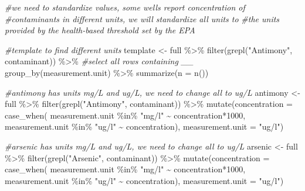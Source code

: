 \documentclass[12pt, twoside]{amherstthesis}
\newenvironment{Shaded}{\begin{snugshade}}{\end{snugshade}}
\newcommand{\AttributeTok}[1]{\textcolor[rgb]{0.77,0.63,0.00}{#1}}
\newcommand{\CommentTok}[1]{\textcolor[rgb]{0.56,0.35,0.01}{\textit{#1}}}
\newcommand{\DecValTok}[1]{\textcolor[rgb]{0.00,0.00,0.81}{#1}}
\newcommand{\FunctionTok}[1]{\textcolor[rgb]{0.00,0.00,0.00}{#1}}
\newcommand{\NormalTok}[1]{#1}
\newcommand{\OtherTok}[1]{\textcolor[rgb]{0.56,0.35,0.01}{#1}}
\newcommand{\SpecialCharTok}[1]{\textcolor[rgb]{0.00,0.00,0.00}{#1}}
\newcommand{\StringTok}[1]{\textcolor[rgb]{0.31,0.60,0.02}{#1}}
\begin{document}
\begin{Shaded}
\begin{Highlighting}[]
\CommentTok{\#we need to standardize values, some wells report concentration of}
\CommentTok{\#contaminants in different units, we will standardize all units to }
\CommentTok{\#the units provided by the health{-}based threshold set by the EPA}

\CommentTok{\#template to find different units}
\NormalTok{template }\OtherTok{\textless{}{-}}\NormalTok{ full }\SpecialCharTok{\%\textgreater{}\%}
  \FunctionTok{filter}\NormalTok{(}\FunctionTok{grepl}\NormalTok{(}\StringTok{"Antimony"}\NormalTok{, contaminant)) }\SpecialCharTok{\%\textgreater{}\%} \CommentTok{\#select all rows containing \_\_}
  \FunctionTok{group\_by}\NormalTok{(measurement.unit) }\SpecialCharTok{\%\textgreater{}\%}
  \FunctionTok{summarize}\NormalTok{(}\AttributeTok{n =} \FunctionTok{n}\NormalTok{())}

\CommentTok{\#antimony has units mg/L and ug/L, we need to change all to ug/L}
\NormalTok{antimony }\OtherTok{\textless{}{-}}\NormalTok{ full }\SpecialCharTok{\%\textgreater{}\%}
  \FunctionTok{filter}\NormalTok{(}\FunctionTok{grepl}\NormalTok{(}\StringTok{"Antimony"}\NormalTok{, contaminant)) }\SpecialCharTok{\%\textgreater{}\%}
  \FunctionTok{mutate}\NormalTok{(}\AttributeTok{concentration =} 
           \FunctionTok{case\_when}\NormalTok{(}
\NormalTok{             measurement.unit }\SpecialCharTok{\%in\%} \StringTok{"mg/l"} \SpecialCharTok{\textasciitilde{}}\NormalTok{ concentration}\SpecialCharTok{*}\DecValTok{1000}\NormalTok{,}
\NormalTok{             measurement.unit }\SpecialCharTok{\%in\%} \StringTok{"ug/l"} \SpecialCharTok{\textasciitilde{}}\NormalTok{ concentration),}
         \AttributeTok{measurement.unit =} \StringTok{"ug/l"}\NormalTok{)}
  
\CommentTok{\#arsenic has units mg/L and ug/L, we need to change all to ug/L}
\NormalTok{arsenic }\OtherTok{\textless{}{-}}\NormalTok{ full }\SpecialCharTok{\%\textgreater{}\%}
  \FunctionTok{filter}\NormalTok{(}\FunctionTok{grepl}\NormalTok{(}\StringTok{"Arsenic"}\NormalTok{, contaminant)) }\SpecialCharTok{\%\textgreater{}\%}
  \FunctionTok{mutate}\NormalTok{(}\AttributeTok{concentration =} 
           \FunctionTok{case\_when}\NormalTok{(}
\NormalTok{             measurement.unit }\SpecialCharTok{\%in\%} \StringTok{"mg/l"} \SpecialCharTok{\textasciitilde{}}\NormalTok{ concentration}\SpecialCharTok{*}\DecValTok{1000}\NormalTok{,}
\NormalTok{             measurement.unit }\SpecialCharTok{\%in\%} \StringTok{"ug/l"} \SpecialCharTok{\textasciitilde{}}\NormalTok{ concentration),}
         \AttributeTok{measurement.unit =} \StringTok{"ug/l"}\NormalTok{)}


\end{Highlighting}
\end{Shaded}
\end{document}
